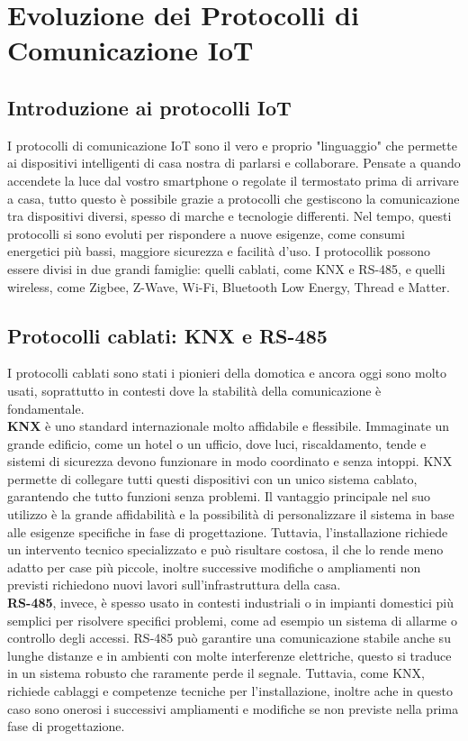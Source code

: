 \chapter{Evoluzione dei Protocolli di Comunicazione IoT}

\section{Introduzione ai protocolli IoT}
I protocolli di comunicazione IoT sono il vero e proprio "linguaggio" che permette ai dispositivi intelligenti di casa nostra di parlarsi e collaborare. Pensate a quando accendete la luce dal vostro smartphone o regolate il termostato prima di arrivare a casa, tutto questo è possibile grazie a protocolli che gestiscono la comunicazione tra dispositivi diversi, spesso di marche e tecnologie differenti. 
Nel tempo, questi protocolli si sono evoluti per rispondere a nuove esigenze, come consumi energetici più bassi, maggiore sicurezza e facilità d’uso. 
I protocollik possono essere divisi in due grandi famiglie: quelli cablati, come KNX e RS-485, e quelli wireless, come Zigbee, Z-Wave, Wi-Fi, Bluetooth Low Energy, Thread e Matter.

\section{Protocolli cablati: KNX e RS-485}
I protocolli cablati sono stati i pionieri della domotica e ancora oggi sono molto usati, soprattutto in contesti dove la stabilità della comunicazione è fondamentale.\\

\textbf{KNX} è uno standard internazionale molto affidabile e flessibile. Immaginate un grande edificio, come un hotel o un ufficio, dove luci, riscaldamento, tende e sistemi di sicurezza devono funzionare in modo coordinato e senza intoppi. KNX permette di collegare tutti questi dispositivi con un unico sistema cablato, garantendo che tutto funzioni senza problemi. 
Il vantaggio principale nel suo utilizzo è la grande affidabilità e la possibilità di personalizzare il sistema in base alle esigenze specifiche in fase di progettazione. Tuttavia, l’installazione richiede un intervento tecnico specializzato e può risultare costosa, il che lo rende meno adatto per case più piccole, inoltre successive modifiche o ampliamenti non previsti richiedono nuovi lavori sull'infrastruttura della casa.\\

\textbf{RS-485}, invece, è spesso usato in contesti industriali o in impianti domestici più semplici per risolvere specifici problemi, come ad esempio un sistema di allarme o controllo degli accessi. 
RS-485 può garantire una comunicazione stabile anche su lunghe distanze e in ambienti con molte interferenze elettriche, questo si traduce in un sistema robusto che raramente perde il segnale. Tuttavia, come KNX, richiede cablaggi e competenze tecniche per l’installazione, inoltre ache in questo caso sono onerosi i successivi ampliamenti e modifiche se non previste nella prima fase di progettazione.

